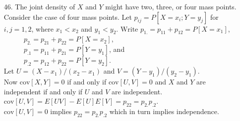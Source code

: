 \begin{enumerate}
	\item[46.] The joint density of $X$ and $Y$ might have two, three, or four mass points. Consider the case of four mass points. Let $p_{ij} = P[X=x_i; Y=y_j]$ for $i,j=1,2$, where $x_1<x_2$ and $y_1<y_2$. \newline
	$\mbox{Write }p_{1.} = p_{11} + p_{12} = P[X=x_1]$, \\
	$\phantom{\mbox{Write }}p_{2.} = p_{21} + p_{22} = P[X=x_2]$, \\
	$\phantom{\mbox{Write }}p_{.1} = p_{11} + p_{21} = P[Y=y_1]$, and \\
	$\phantom{\mbox{Write }}p_{.2} = p_{12} + p_{22} = P[Y=y_2]$. \\
	Let $U = (X-x_1)/(x_2-x_1)$ and $V = (Y-y_1)/(y_2-y_1)$. \\
	Now $\mbox{cov}[X,Y]=0$ if and only if $\mbox{cov}[U,V]=0$ and $X$ and $Y$ are independent if and only if $U$ and $V$ are independent. \\
	$\mbox{cov}[U,V] = E[UV]-E[U]E[V] = p_{22} = p_{2.}p_{.2}$. \\
	$\mbox{cov}[U,V]=0$ implies $p_{22}=p_{2.}p_{.2}$ which in turn implies independence. 
	
\end{enumerate}
